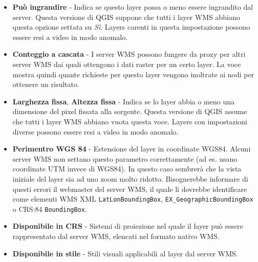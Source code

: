 \begin{itemize}
\begin{itemize}
\item \textbf{Può ingrandire}      - Indica se questo layer possa o meno
                                     essere ingrandito dal server.
				     Questa versione di QGIS suppone che tutti i
                                     layer WMS abbiano questa opzione settata su \textsl{Sì}.
                                     Layers carenti in questa impostazione
				     possono essere resi a video in modo
				     anomalo.

\item \textbf{Conteggio a cascata}    - I server WMS possono fungere da proxy
                                        per altri server WMS dai quali ottengono
					i dati raster per un certo layer. La
                                        voce mostra quindi quante richieste per questo
					layer vengono inoltrate ai nodi
                                        per ottenere un risultato.

\item \textbf{Larghezza fissa}, \textbf{Altezza fissa}
                                - Indica se lo layer abbia o meno una
				dimensione del pixel fissata alla sorgente.
                                  Questa versione di QGIS assume che tutti i
				  layer WMS abbiano vuota questa voce. Layers
				  con impostazioni diverse possono essere resi
				  a video in modo anomalo.

\item \textbf{Perimentro WGS 84} - Estensione del layer in coordinate WGS84. Alcuni server
                                   WMS non settano questo parametro correttamente (ad
				   es. usano coordinate UTM invece di WGS84).
				   In questo caso sembrerà che la vista
				   iniziale del layer
                                   sia ad uno zoom molto ridotto. Bisognerebbe
				   informare di questi errori il webmaster del
				   server WMS, il quale li dovrebbe
				   identificare come elementi
				   WMS XML \texttt{LatLonBoundingBox},
				   \texttt{EX\_GeographicBoundingBox} o CRS:84 \texttt{BoundingBox}.

\item \textbf{Disponibile in CRS} - Sistemi di proiezione nel quale il layer
                                    può essere rappresentato dal server WMS,
				    elencati nel formato nativo WMS.

\item \textbf{Disponibile in stile} - Stili visuali applicabili al layer dal server WMS.

\end{itemize}

\end{itemize}


